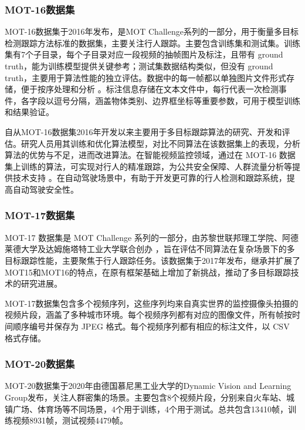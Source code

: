 \subsubsection{MOT-16数据集}
MOT-16数据集于2016年发布，是MOT Challenge系列的一部分，用于衡量多目标检测跟踪方法标准的数据集，主要关注行人跟踪。主要包含训练集和测试集。训练集有7个子目录，每个子目录对应一段视频的抽帧图片及标注，且带有 ground truth，能为训练模型提供关键参考；测试集数据结构类似，但没有 ground truth，主要用于算法性能的独立评估。数据中的每一帧都以单独图片文件形式存储，便于按序处理和分析 。标注信息存储在文本文件中，每行代表一次检测事件，各字段以逗号分隔，涵盖物体类别、边界框坐标等重要参数，可用于模型训练和结果验证。

自从MOT-16数据集2016年开发以来主要用于多目标跟踪算法的研究、开发和评估。研究人员用其训练和优化算法模型，对比不同算法在该数据集上的表现，分析算法的优势与不足，进而改进算法。在智能视频监控领域，通过在 MOT-16 数据集上训练的算法，可实现对行人的精准跟踪，为公共安全保障、人群流量分析等提供技术支持 。在自动驾驶场景中，有助于开发更可靠的行人检测和跟踪系统，提高自动驾驶安全性。





\subsubsection{MOT-17数据集}
MOT-17 数据集是 MOT Challenge 系列的一部分，由苏黎世联邦理工学院、阿德莱德大学及达姆施塔特工业大学联合创办 ，旨在评估不同算法在复杂场景下的多目标跟踪性能，主要聚焦于行人跟踪任务。该数据集于2017年发布，继承并扩展了MOT15和MOT16的特点，在原有框架基础上增加了新挑战，推动了多目标跟踪技术的研究进展。

MOT-17数据集包含多个视频序列，这些序列均来自真实世界的监控摄像头拍摄的视频片段，涵盖了多种城市环境。每个视频序列都有对应的图像文件，所有帧按时间顺序编号并保存为 JPEG 格式。每个视频序列都有相应的标注文件，以 CSV 格式存储。





\subsubsection{MOT-20数据集}

MOT-20数据集于2020年由德国慕尼黑工业大学的Dynamic Vision and Learning Group发布，关注人群密集的场景。主要包含8个视频片段，分别来自火车站、城镇广场、体育场等不同场景，4个用于训练，4个用于测试。总共包含13410帧，训练视频8931帧，测试视频4479帧。

